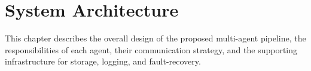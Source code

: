 \chapter{System Architecture}
\label{chapter:architecture}

% 
% 



This chapter describes the overall design of the proposed multi-agent pipeline, the responsibilities of each agent, their communication strategy, and the supporting infrastructure for storage, logging, and fault-recovery.




